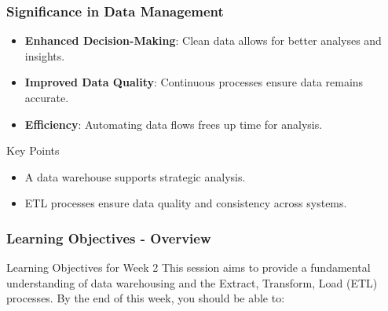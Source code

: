 \documentclass{beamer}
\begin{document}
\begin{frame}[fragile]
    \frametitle{Significance in Data Management}
    \begin{itemize}
        \item \textbf{Enhanced Decision-Making}: Clean data allows for better analyses and insights.
        \item \textbf{Improved Data Quality}: Continuous processes ensure data remains accurate.
        \item \textbf{Efficiency}: Automating data flows frees up time for analysis.
    \end{itemize}
    \begin{block}{Key Points}
        \begin{itemize}
            \item A data warehouse supports strategic analysis.
            \item ETL processes ensure data quality and consistency across systems.
        \end{itemize}
    \end{block}
\end{frame}

\begin{frame}[fragile]
    \frametitle{Learning Objectives - Overview}
    \begin{block}{Learning Objectives for Week 2}
        This session aims to provide a fundamental understanding of data warehousing and the Extract, Transform, Load (ETL) processes. 
        By the end of this week, you should be able to:
    \end{block}
\end{frame}
\end{document}
